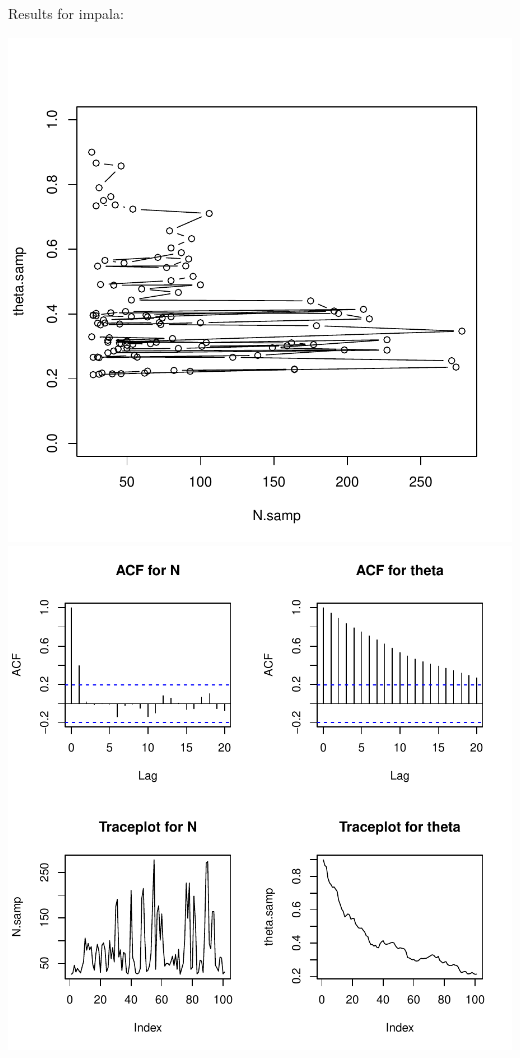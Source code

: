 \documentclass[letterpaper,12pt]{amsart}
\begin{document}
\begin{enumerate}[1.]
Results for impala:
\begin{center}
\includegraphics[scale=0.5]{impala-scatterplot.pdf}
\includegraphics[scale=0.5]{impala-diagnostics.pdf}
\end{center}


\end{enumerate}
\end{document}
